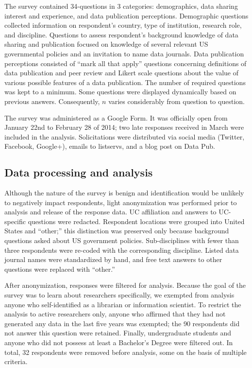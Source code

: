 \documentclass[10pt]{article}
\begin{document}
The survey contained 34-questions in 3 categories: demographics, data sharing interest and experience, and data publication perceptions.
Demographic questions collected information on respondent's country, type of institution, research role, and discipline.
Questions to assess respondent's background knowledge of data sharing and publication focused on knowledge of several relevant US governmental policies and an invitation to name data journals.
Data publication perceptions consisted of ``mark all that apply'' questions concerning definitions of data publication and peer review and Likert scale questions about the value of various possible features of a data publication.
The number of required questions was kept to a minimum.
Some questions were displayed dynamically based on previous answers. 
Consequently, $n$ varies considerably from question to question.

The survey was administered as a Google Form.
It was officially open from January 22nd to February 28 of 2014; two late responses received in March were included in the analysis.
Solicitations were distributed via social media (Twitter, Facebook, Google+), emails to listservs, and a blog post on Data Pub\cite{kratz_data_2014}.

\subsection*{Data processing and analysis}
Although the nature of the survey is benign and identification would be unlikely to negatively impact respondents, light anonymization was performed prior to analysis and release of the response data.
UC affiliation and answers to UC-specific questions were redacted.
Respondent locations were grouped into United States and ``other;'' this distinction was preserved only because background questions asked about US government policies.  
Sub-disciplines with fewer than three respondents were re-coded with the corresponding discipline.
Listed data journal names were standardized by hand, and free text answers to other questions were replaced with ``other.''

After anonymization, responses were filtered for analysis.
Because the goal of the survey was to learn about researchers specifically, we exempted from analysis anyone who self-identified as a librarian or information scientist.
To restrict the analysis to active researchers only, anyone who affirmed that they had not generated any data in the last five years was exempted; the 90 respondents did not answer this question were retained.
Finally, undergraduate students and anyone who did not possess at least a Bachelor's Degree were filtered out.
In total, 32 respondents were removed before analysis, some on the basis of multiple criteria.
\end{document}

